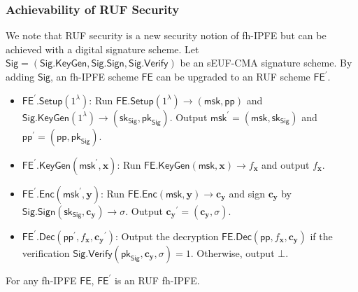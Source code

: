 \subsubsection{Achievability of RUF Security}

We note that RUF security is a new security notion of fh-IPFE but can be achieved with a digital signature scheme. Let $\textsf{Sig} = ( \textsf{Sig.KeyGen}, \textsf{Sig.Sign}, \textsf{Sig.Verify} )$ be an sEUF-CMA signature scheme. By adding $\textsf{Sig}$, an fh-IPFE scheme $\textsf{FE}$ can be upgraded to an RUF scheme $\textsf{FE}^\prime$. 

\begin{itemize}

	\item $\textsf{FE}^\prime \textsf{.Setup}(1^\lambda)$: Run $\textsf{FE.Setup}(1^\lambda) \to (\textsf{msk}, \textsf{pp})$ and $\textsf{Sig.KeyGen}(1^\lambda) \to (\textsf{sk}_{\textsf{Sig}}, \textsf{pk}_{\textsf{Sig}} )$. Output $\textsf{msk}^\prime = (\textsf{msk}, \textsf{sk}_\textsf{Sig})$ and $\textsf{pp}^\prime = (\textsf{pp}, \textsf{pk}_{\textsf{Sig}})$.

	\item $\textsf{FE}^\prime \textsf{.KeyGen}(\textsf{msk}^\prime, \mathbf{x})$: Run $\textsf{FE.KeyGen}(\textsf{msk}, \mathbf{x}) \to f_\mathbf{x}$ and output $f_\mathbf{x}$.

	\item $\textsf{FE}^\prime \textsf{.Enc}(\textsf{msk}^\prime, \mathbf{y})$: Run $\textsf{FE.Enc}(\textsf{msk}, \mathbf{y}) \to \mathbf{c_y}$ and sign $\mathbf{c_y}$ by $\textsf{Sig.Sign}(\textsf{sk}_{\textsf{Sig}}, \mathbf{c_y}) \to \sigma$. Output $\mathbf{c_y}^\prime = (\mathbf{c_y}, \sigma)$.

	\item $\textsf{FE}^\prime \textsf{.Dec}(\textsf{pp}^\prime, f_\mathbf{x}, \mathbf{c_y}^\prime )$: Output the decryption $\textsf{FE.Dec}(\textsf{pp}, f_\mathbf{x}, \mathbf{c_y})$ if the verification $\textsf{Sig.Verify}(\textsf{pk}_{\textsf{Sig}}, \mathbf{c_y}, \sigma ) = 1$. Otherwise, output $\bot$.

\end{itemize}

\begin{theorem}

For any fh-IPFE $\textsf{FE}$, $\textsf{FE}^\prime$ is an RUF fh-IPFE.

\end{theorem}

